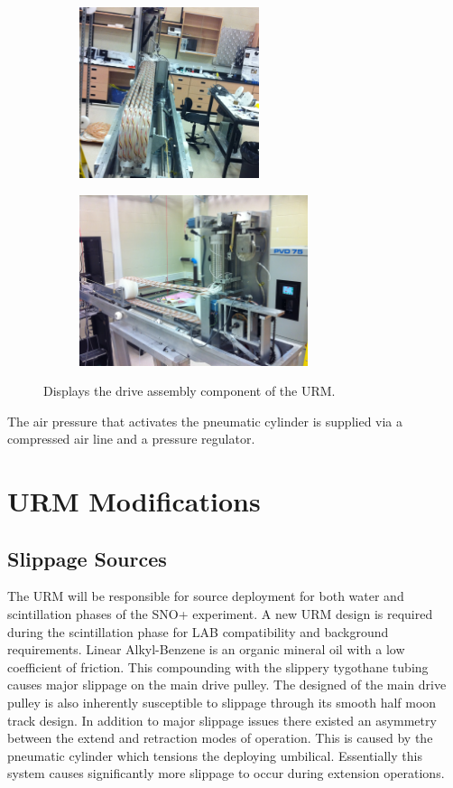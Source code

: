 \documentclass[paper=a4, fontsize=11pt]{scrartcl}
\numberwithin{equation}{section}		%
\numberwithin{figure}{section}			%
\numberwithin{table}{section}				%
\begin{document}
\begin{figure}[h]
        \centering
        \begin{subfigure}[h]{0.8\textwidth}
                \includegraphics[height = 5cm]{hhh1}
                \caption{}
				
        \end{subfigure}%
       \quad
        \begin{subfigure}[h]{0.8\textwidth}
                \includegraphics[height = 5cm]{hhh2}
                \caption{}
                \label{dr2}
        \end{subfigure}
        \quad

        \caption{Displays the drive assembly component of the URM.}
        \label{hhh}
\end{figure}
The air pressure that activates the pneumatic cylinder is supplied via a compressed air line and a pressure regulator. 
\section{URM Modifications}
\subsection{Slippage Sources}
The URM will be responsible for source deployment for both water and scintillation phases of the SNO+ experiment. A new URM design is required during the scintillation phase for LAB compatibility and background requirements. Linear Alkyl-Benzene is an organic mineral oil with a low coefficient of friction. This compounding with the slippery tygothane tubing causes major slippage on the main drive pulley. The designed of the main drive pulley is also inherently susceptible to slippage through its smooth half moon track design. In addition to major slippage issues there existed an asymmetry between the extend and retraction modes of operation. This is caused by the pneumatic cylinder which tensions the deploying umbilical. Essentially this system causes significantly more slippage to occur during extension operations.
\end{document}
